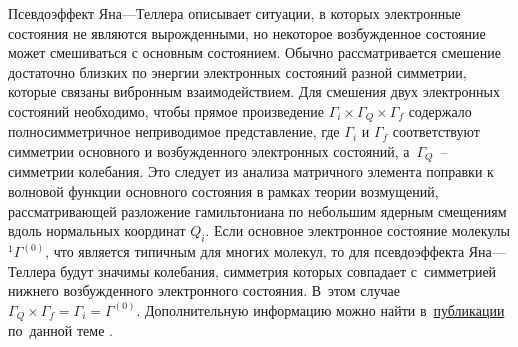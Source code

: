  Псевдоэффект Яна—Теллера описывает ситуации, в которых электронные состояния не являются вырожденными, но некоторое возбужденное состояние может смешиваться с основным состоянием. Обычно рассматривается смешение достаточно близких по энергии электронных состояний разной симметрии, которые связаны вибронным взаимодействием. Для смешения двух электронных состояний необходимо, чтобы прямое произведение $\Gamma_i \times \Gamma_Q \times \Gamma_f$ содержало полносимметричное неприводимое представление, где $\Gamma_i$ и $\Gamma_f$ соответствуют симметрии основного и возбужденного электронных состояний, а~$\Gamma_Q$~– симметрии колебания. Это следует из анализа матричного элемента поправки к волновой функции основного состояния в рамках теории возмущений, рассматривающей разложение гамильтониана по небольшим ядерным смещениям вдоль нормальных координат $Q_i$. Если основное электронное состояние молекулы $^1\Gamma^{(0)}$, что является типичным для многих молекул, то для псевдоэффекта Яна—Теллера будут значимы колебания, симметрия которых совпадает с~симметрией нижнего возбужденного электронного состояния. В~этом случае $\Gamma_Q \times \Gamma_f = \Gamma_i = \Gamma^{(0)}$. Дополнительную информацию можно найти в~\href{https://doi.org/10.1016/0166-1280(83)85006-4}{публикации} по~данной теме \parencite{pearson1983}.\par
\newpage

